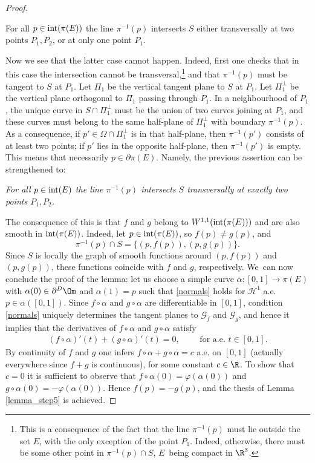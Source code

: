 \begin{proof}
\begin{assertion*}
For all $p\in\textup{int}(\pi(E))$ the line $\pi^{-1}(p)$
intersects $S$ either
transversally at two points $P_1,P_2$, or at only one point $P_1$.
\end{assertion*}

Now we see that the latter case cannot happen.
Indeed, first one checks
that in this case the intersection cannot be transversal,\footnote{This is a consequence of the fact that the line $\pi^{-1}(p)$ must lie outside the set $E$, with the only exception of the point $P_1$. Indeed, otherwise, there must be some other point in $\pi^{-1}(p)\cap S$, $E$~being compact in $\R^3$.} and that $\pi^{-1}(p)$ must be tangent to $S$ at $P_1$. Let $\Pi_1$ be the
vertical tangent plane to $S$ at $P_1$.
Let $\Pi_1^\perp$ be the vertical plane orthogonal to $\Pi_1$
passing
through $P_1$. In a neighbourhood of $P_1$, the unique curve in $S\cap \Pi_1^\perp$
must be the union of two curves joining at $P_1$, and these curves must belong to
the same half-plane of $\Pi_1^\perp$ with boundary $\pi^{-1}(p)$.
As a consequence, if $p'\in \Omega\cap \Pi_1^\perp$ is in
that half-plane, then $\pi^{-1}(p')$ consists of at least two points; if $p'$ lies in the opposite half-plane, then $\pi^{-1}(p')$ is empty. This means that necessarily $p\in \partial \pi(E)$. Namely, the previous assertion can be strengthened to:

\textit{For all $p\in\textup{int}(E)$ the line $\pi^{-1}(p)$ intersects $S$ transversally at exactly two points $P_1,P_2$.}

The consequence of this is that $f$ and $g$ belong to $W^{1,1}(\textup{int}(\pi(E)))$ and are also smooth in $\textup{int}(\pi(E))$.
Indeed, let $p\in \textup{int}(\pi(E))$, so $f(p)\neq g(p)$, and
\begin{equation}\label{twopoints}
\pi^{-1}(p)\cap S=\{(p,f(p)),(p,g(p))\}.
\end{equation}
Since $S$ is locally the graph of smooth functions around $(p,f(p))$ and $(p,g(p))$,
these functions coincide with $f$ and $g$, respectively. We~can now conclude the proof
of the lemma: let us choose a simple curve $\alpha:[0,1]\to \pi(E)$ with $\alpha(0)\in \partial^D\Om$ and $\alpha(1)=p$ such that \eqref{normals} holds for $\mathcal H^1$ a.e. $p\in \alpha([0,1])$. Since $f\circ \alpha$ and $g\circ \alpha$
are differentiable in $[0,1]$, condition
\eqref{normals} uniquely determines the tangent planes to $\mathcal G_f$ and $\mathcal G_g$, and hence it implies that the derivatives of $f\circ \alpha$ and $g\circ\alpha$ satisfy
\begin{align}
(f\circ \alpha)'(t)+(g\circ \alpha)'(t)=0,\qquad \text{ for a.e. }t\in[0,1].
\end{align}
By continuity of $f$ and $g$ one infers $f\circ\alpha+g\circ\alpha=c$ a.e. on $[0,1]$ (actually everywhere since $f+g$ is continuous), for some constant $c\in\R$. To show that $c=0$ it is sufficient to observe that $f\circ\alpha(0)=\varphi(\alpha(0))$ and $g\circ\alpha(0)=-\varphi(\alpha(0))$. Hence $f(p)=-g(p)$, and the thesis of Lemma \ref{lemma_step5} is achieved.
\end{proof}

